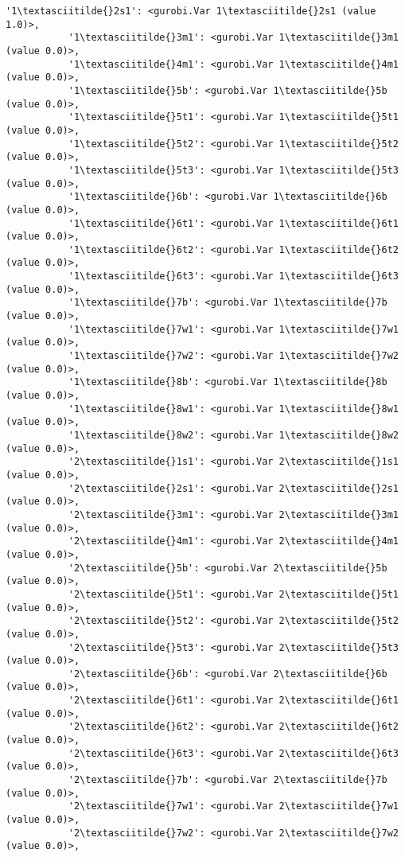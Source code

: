 \documentclass[11pt]{article}
\begin{document}
\begin{Verbatim}[commandchars=\\\{\}]
           '1\textasciitilde{}2s1': <gurobi.Var 1\textasciitilde{}2s1 (value 1.0)>,
           '1\textasciitilde{}3m1': <gurobi.Var 1\textasciitilde{}3m1 (value 0.0)>,
           '1\textasciitilde{}4m1': <gurobi.Var 1\textasciitilde{}4m1 (value 0.0)>,
           '1\textasciitilde{}5b': <gurobi.Var 1\textasciitilde{}5b (value 0.0)>,
           '1\textasciitilde{}5t1': <gurobi.Var 1\textasciitilde{}5t1 (value 0.0)>,
           '1\textasciitilde{}5t2': <gurobi.Var 1\textasciitilde{}5t2 (value 0.0)>,
           '1\textasciitilde{}5t3': <gurobi.Var 1\textasciitilde{}5t3 (value 0.0)>,
           '1\textasciitilde{}6b': <gurobi.Var 1\textasciitilde{}6b (value 0.0)>,
           '1\textasciitilde{}6t1': <gurobi.Var 1\textasciitilde{}6t1 (value 0.0)>,
           '1\textasciitilde{}6t2': <gurobi.Var 1\textasciitilde{}6t2 (value 0.0)>,
           '1\textasciitilde{}6t3': <gurobi.Var 1\textasciitilde{}6t3 (value 0.0)>,
           '1\textasciitilde{}7b': <gurobi.Var 1\textasciitilde{}7b (value 0.0)>,
           '1\textasciitilde{}7w1': <gurobi.Var 1\textasciitilde{}7w1 (value 0.0)>,
           '1\textasciitilde{}7w2': <gurobi.Var 1\textasciitilde{}7w2 (value 0.0)>,
           '1\textasciitilde{}8b': <gurobi.Var 1\textasciitilde{}8b (value 0.0)>,
           '1\textasciitilde{}8w1': <gurobi.Var 1\textasciitilde{}8w1 (value 0.0)>,
           '1\textasciitilde{}8w2': <gurobi.Var 1\textasciitilde{}8w2 (value 0.0)>,
           '2\textasciitilde{}1s1': <gurobi.Var 2\textasciitilde{}1s1 (value 0.0)>,
           '2\textasciitilde{}2s1': <gurobi.Var 2\textasciitilde{}2s1 (value 0.0)>,
           '2\textasciitilde{}3m1': <gurobi.Var 2\textasciitilde{}3m1 (value 0.0)>,
           '2\textasciitilde{}4m1': <gurobi.Var 2\textasciitilde{}4m1 (value 0.0)>,
           '2\textasciitilde{}5b': <gurobi.Var 2\textasciitilde{}5b (value 0.0)>,
           '2\textasciitilde{}5t1': <gurobi.Var 2\textasciitilde{}5t1 (value 0.0)>,
           '2\textasciitilde{}5t2': <gurobi.Var 2\textasciitilde{}5t2 (value 0.0)>,
           '2\textasciitilde{}5t3': <gurobi.Var 2\textasciitilde{}5t3 (value 0.0)>,
           '2\textasciitilde{}6b': <gurobi.Var 2\textasciitilde{}6b (value 0.0)>,
           '2\textasciitilde{}6t1': <gurobi.Var 2\textasciitilde{}6t1 (value 0.0)>,
           '2\textasciitilde{}6t2': <gurobi.Var 2\textasciitilde{}6t2 (value 0.0)>,
           '2\textasciitilde{}6t3': <gurobi.Var 2\textasciitilde{}6t3 (value 0.0)>,
           '2\textasciitilde{}7b': <gurobi.Var 2\textasciitilde{}7b (value 0.0)>,
           '2\textasciitilde{}7w1': <gurobi.Var 2\textasciitilde{}7w1 (value 0.0)>,
           '2\textasciitilde{}7w2': <gurobi.Var 2\textasciitilde{}7w2 (value 0.0)>,

\end{Verbatim}
\end{document}
